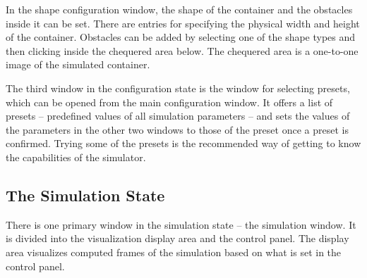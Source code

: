 \documentclass[11pt,a4paper,twoside,openright]{report}
\begin{document}
In the shape configuration window, the shape of the container and the obstacles inside it can be set. There are entries for specifying the physical width and height of the container. Obstacles can be added by selecting one of the shape types and then clicking inside the chequered area below. The chequered area is a one-to-one image of the simulated container.

The third window in the configuration state is the window for selecting presets, which can be opened from the main configuration window. It offers a list of presets -- predefined values of all simulation parameters -- and sets the values of the parameters in the other two windows to those of the preset once a preset is confirmed. Trying some of the presets is the recommended way of getting to know the capabilities of the simulator.

\subsection{The Simulation State}
There is one primary window in the simulation state -- the simulation window. It is divided into the visualization display area and the control panel. The display area visualizes computed frames of the simulation based on what is set in the control panel.
\end{document}
